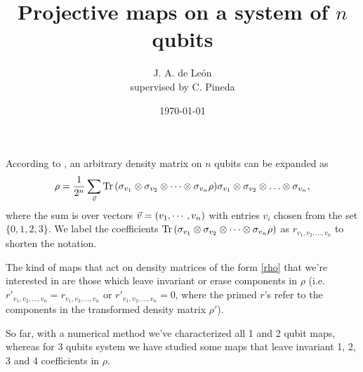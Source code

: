 \documentclass[11pt,dvipsnames]{article}
\begin{document}
\title{Projective maps on a system of $n$ qubits} 
\author{J. A. de León\\
				\small{supervised by C. Pineda}}


\date{\today}  

\maketitle


According to \cite{nielsen_chuang_2011}, an arbitrary density matrix on $n$  
qubits can be expanded as
\begin{align}
	\rho = \frac{1}{2^n}\sum _{\vec{v}} \Tr 
                  \qty( \sigma _{v_1} \otimes \sigma_{v_2} \otimes 
               \cdots \otimes \sigma_{v_n} \rho) \sigma _{v_1} \otimes 
             \sigma_{v_2} \otimes \ldots \otimes \sigma_{v_n},
	\label{rho}
\end{align}
where the sum is over vectors $\vec{v}=\qty(v_1,\cdots, v_n)$ with entries
$v_i$ chosen from the set $\{0,1,2,3\}$. We label the coefficients $\Tr \qty(
\sigma _{v_1} \otimes \sigma_{v_2} \otimes \cdots \otimes \sigma_{v_n}
\rho )$ as $r_{v_1, v_2,\ldots, v_n}$ to shorten the notation. 

The kind of maps that act on density matrices of the form \eqref{rho} that
we're interested in are those which leave invariant or erase  
components
in $\rho$ (i.e. $r'_{v_1, v_2,\ldots, v_n}=r_{v_1, v_2,\ldots, v_n}$ or
$r'_{v_1, v_2,\ldots, v_n}=0$, where the primed $r$'s refer to the 
components in the transformed density matrix $\rho '$). 

So far, with a numerical method we've characterized all 1 and 2 qubit maps, 
whereas for 3 qubits system we have studied some maps that leave invariant 1, 2,
3 and 4 coefficients in $\rho$. \newline
\end{document}
